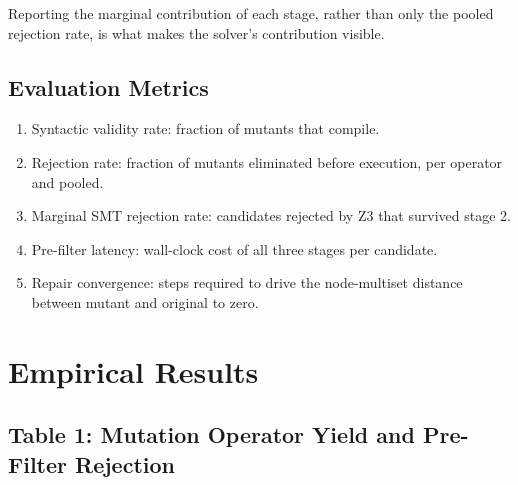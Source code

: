 \documentclass[10pt,twocolumn,letterpaper]{article}
\begin{document}
Reporting the marginal contribution of each stage, rather than only the pooled rejection rate, is what makes the solver's contribution visible.


\subsection{Evaluation Metrics}


\begin{enumerate}
  \item Syntactic validity rate: fraction of mutants that compile.
  \item Rejection rate: fraction of mutants eliminated before execution, per operator and pooled.
  \item Marginal SMT rejection rate: candidates rejected by Z3 that survived stage 2.
  \item Pre-filter latency: wall-clock cost of all three stages per candidate.
  \item Repair convergence: steps required to drive the node-multiset distance between mutant and original to zero.
\end{enumerate}




\section{Empirical Results}



\subsection{Table 1: Mutation Operator Yield and Pre-Filter Rejection}
\begin{table}[htbp]
\centering
{}
\end{table}
\end{document}
